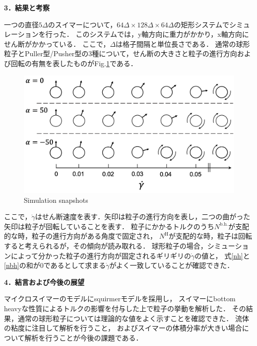 \documentclass[twocolumns,10pt,a4j]{jarticle}
\begin{document}
  \noindent
  {\bf \large 3．結果と考察}
  \par
一つの直径$5\Delta$のスイマーについて，$64\Delta \times 128\Delta \times 64\Delta$の矩形システムでシミュレーションを行った．
このシステムでは，y軸方向に重力がかかり，x軸方向にせん断がかかっている．
ここで，$\Delta$は格子間隔と単位長さである．
通常の球形粒子とPuller型/Pusher型の3種について，せん断の大きさと粒子の進行方向および回転の有無を表したものがFig.\ref{snapshots}である．
  \vspace{-3truemm}
  \begin{figure}[h]
    \hspace{-3truemm}
    \centering
    \includegraphics[width=80truemm]{./images/rotation.png}
    \vspace{-6truemm}
    \hspace{-2truemm}
    \caption{Simulation snapshots}
    \label{snapshots}
  \end{figure}
  \vspace{-3truemm}

  \noindent
ここで，$\dot{\gamma}$はせん断速度を表す．矢印は粒子の進行方向を表し，二つの曲がった矢印は粒子が回転していることを表す．
粒子にかかるトルクのうち$N^\mathrm{b.h.}$が支配的な時，粒子の進行方向がある角度で固定され，
$N^\mathrm{H}$が支配的な時，粒子は回転すると考えられるが，その傾向が読み取れる．
球形粒子の場合，シミューションによって分かった粒子の進行方向が固定されるギリギリの$\dot{\gamma}$の値と，
式\eqref{nh}と\eqref{nbh}の和が0であるとして求まる$\dot{\gamma}$がよく一致していることが確認できた．


  \noindent
  \textbf{\large 4．結言および今後の展望}
  \par
マイクロスイマーのモデルにsquirmerモデルを採用し，
スイマーにbottom heavyな性質によるトルクの影響を付与した上で粒子の挙動を解析した．
その結果，通常の球形粒子については理論的な値をよく示すことを確認できた．
流体の粘度に注目して解析を行うこと，
およびスイマーの体積分率が大きい場合について解析を行うことが今後の課題である．
  \vspace{-7.5truemm}
\end{document}
